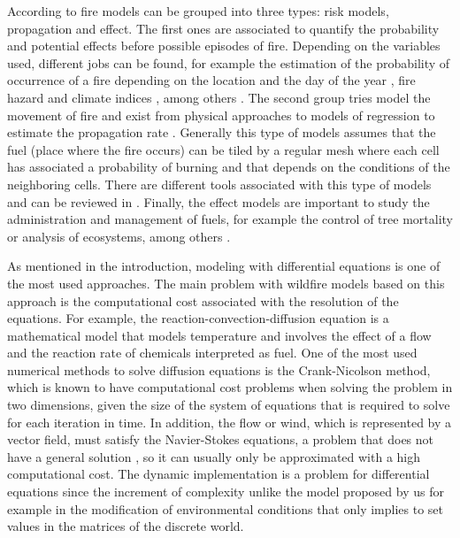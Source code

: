 \documentclass[conference]{IEEEtran}
\begin{document}
    According to \cite{preisler2013forest} fire models can be grouped into three types: risk models, 
    propagation and effect. The first ones are associated to quantify the probability and potential effects before
    possible episodes of fire. Depending on the variables used, different jobs can be found, for example
    the estimation of the probability of occurrence of a fire depending on the location and the day of the year
    \cite{brillinger2003risk, hernandez2010integrating}, fire hazard and climate indices \cite{van1987development,
    burgan19881988}, among others \cite{braun2010forest, ager2007modeling, calkin2011comparative}. The second group tries
    model the movement of fire and exist from physical approaches \cite{rothermel1972mathematical} to models of
    regression to estimate the propagation rate \cite{sullivan2009wildland}. Generally this type of models assumes that
    the fuel (place where the fire occurs) can be tiled by a regular mesh where each cell has
    associated a probability of burning and that depends on the conditions of the neighboring cells. There are different
    tools associated with this type of models and can be reviewed in \cite{andrews1986behave, finney2006overview,
    finney1998farsite, finney2011simulation, finney2011method}. Finally, the effect models are important
    to study the administration and management of fuels, for example the control of tree mortality
    or analysis of ecosystems, among others \cite{Larkin-2009, reinhardt2003using, robichaud2007predicting}. \medskip
    
    As mentioned in the introduction, modeling with differential equations is one of the most used approaches. 
    The main problem with wildfire models based on this approach is the computational cost associated with the 
    resolution of the equations. For example, the reaction-convection-diffusion equation \cite{liu2009elementary} is 
    a mathematical model that models temperature and involves the effect of a flow and the reaction rate of 
    chemicals interpreted as fuel. One of the most used numerical methods to solve diffusion equations is the 
    Crank-Nicolson method, which is known to have computational cost problems when solving the problem in two 
    dimensions, given the size of the system of equations that is required to solve for each iteration in time. 
    In addition, the flow or wind, which is represented by a vector field, must satisfy the Navier-Stokes 
    equations, a problem that does not have a general solution \cite{fefferman2006existence}, so it can usually 
    only be approximated with a high computational cost. The dynamic implementation is a problem for differential
    equations since the increment of complexity unlike the model proposed by us for example in the modification
    of environmental conditions that only implies to set values in the matrices of the discrete world. \medskip
    
\end{document}
